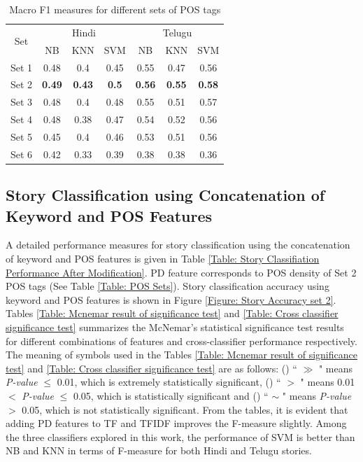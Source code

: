 \documentclass[times, 11pt, a4paper]{article}
\begin{document}
\begin{table}[!htbp]
\renewcommand{\arraystretch}{0.9}
\caption {Macro F1 measures for different sets of POS tags \label{Table: POS}}
\footnotesize\setlength{\tabcolsep}{6pt}
\centering
\begin{tabular}{|c|c|c|c||c|c|c|}
\hline
\multirow{2}{*}{Set} & \multicolumn{3}{c||}{Hindi} & \multicolumn{3}{c|}{Telugu} \\ \cline{2-7} 
 & NB & KNN & SVM & NB & KNN & SVM \\ \hline
Set 1 & 0.48 & 0.4 & 0.45 & 0.55 & 0.47 & 0.56 \\ \hline
Set 2 & \textbf{0.49} & \textbf{0.43} & \textbf{0.5} & \textbf{0.56} & \textbf{0.55} & \textbf{0.58} \\ \hline
Set 3 & 0.48 & 0.4 & 0.48 & 0.55 & 0.51 & 0.57 \\ \hline
Set 4 & 0.48 & 0.38 & 0.47 & 0.54 & 0.52 & 0.56 \\ \hline
Set 5 & 0.45 & 0.4 & 0.46 & 0.53 & 0.51 & 0.56 \\ \hline
Set 6 & 0.42 & 0.33 & 0.39 & 0.38 & 0.38 & 0.36 \\ \hline
\end{tabular}
\end{table}

\newpage

\subsection{Story Classification using Concatenation of Keyword and POS Features}

	A detailed performance measures for story classification using the concatenation of keyword and POS features is given in Table \ref{Table: Story Classifiation Performance After Modification}. PD feature corresponds to POS density of Set 2 POS tags (See Table \ref{Table: POS Sets}). Story classification accuracy using keyword and POS features is shown in Figure \ref{Figure: Story Accuracy set 2}. Tables  \ref{Table: Mcnemar result of significance test} and \ref{Table: Cross classifier significance test} summarizes the McNemar's statistical significance test results for different combinations of features and cross-classifier performance respectively. The meaning of symbols used in the Tables \ref{Table: Mcnemar result of significance test} and \ref{Table: Cross classifier significance test} are as follows: () `` $\gg$ " means \textit{P-value} $\leq$ 0.01, which is extremely statistically significant, () `` $>$ " means 0.01 $<$ \textit{P-value} $\leq$ 0.05, which is statistically significant and () `` $\sim$ " means \textit{P-value} $>$ 0.05, which is not statistically significant. From the tables, it is evident that adding PD features to TF and TFIDF improves the F-measure slightly. Among the three classifiers explored in this work, the performance of SVM is better than NB and KNN in terms of F-measure for both Hindi and Telugu stories. 
	
\end{document}
